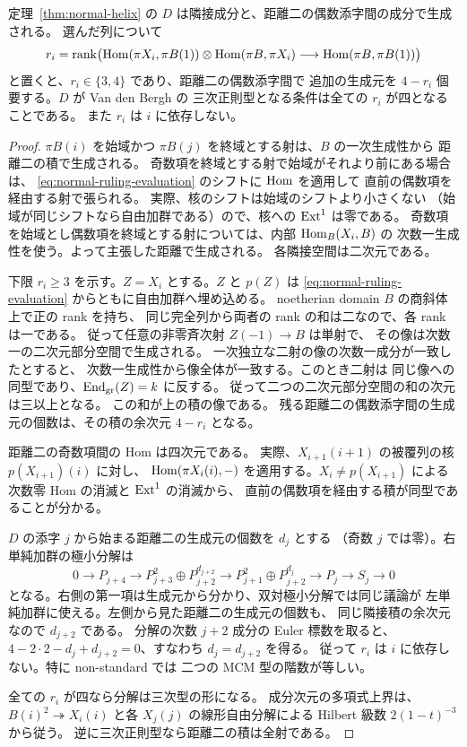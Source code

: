 \begin{corollary}[三次正則型からのずれ]
\label{cor:normal-cubic-defect}
定理~\ref{thm:normal-helix} の $D$ は隣接成分と、距離二の偶数添字間の成分で生成される。
選んだ列について
\[
 r_i=\operatorname{rank}\bigl(
 \operatorname{Hom}(\pi X_i,\pi B(1))\otimes\operatorname{Hom}(\pi B,\pi X_i)
 \longrightarrow\operatorname{Hom}(\pi B,\pi B(1))
 \bigr)
\]
と置くと、$r_i\in\{3,4\}$ であり、距離二の偶数添字間で
追加の生成元を $4-r_i$ 個要する。$D$ が Van den Bergh の
三次正則型となる条件は全ての $r_i$ が四となることである。
また $r_i$ は $i$ に依存しない。
\end{corollary}
\begin{proof}
$\pi B(i)$ を始域かつ $\pi B(j)$ を終域とする射は、$B$ の一次生成性から
距離二の積で生成される。
奇数項を終域とする射で始域がそれより前にある場合は、
\eqref{eq:normal-ruling-evaluation} のシフトに $\operatorname{Hom}$ を適用して
直前の偶数項を経由する射で張られる。
実際、核のシフトは始域のシフトより小さくない
（始域が同じシフトなら自由加群である）ので、核への $\operatorname{Ext}^1$ は零である。
奇数項を始域とし偶数項を終域とする射については、内部 $\operatorname{Hom}_B(X_i,B)$ の
次数一生成性を使う。よって主張した距離で生成される。
各隣接空間は二次元である。

下限 $r_i\ge3$ を示す。$Z=X_i$ とする。$Z$ と $p(Z)$ は
\eqref{eq:normal-ruling-evaluation} からともに自由加群へ埋め込める。
noetherian domain $B$ の商斜体上で正の rank を持ち、
同じ完全列から両者の rank の和は二なので、各 rank は一である。
従って任意の非零斉次射 $Z(-1)\to B$ は単射で、
その像は次数一の二次元部分空間で生成される。
一次独立な二射の像の次数一成分が一致したとすると、
次数一生成性から像全体が一致する。このとき二射は
同じ像への同型であり、$\operatorname{End}_{\mathrm{gr}}(Z)=k$ に反する。
従って二つの二次元部分空間の和の次元は三以上となる。
この和が上の積の像である。
残る距離二の偶数添字間の生成元の個数は、その積の余次元 $4-r_i$ となる。

距離二の奇数項間の Hom は四次元である。
実際、$X_{i+1}(i+1)$ の被覆列の核 $p(X_{i+1})(i)$ に対し、
$\operatorname{Hom}(\pi X_i(i),-)$ を適用する。$X_i\ne p(X_{i+1})$ による
次数零 Hom の消滅と $\operatorname{Ext}^1$ の消滅から、
直前の偶数項を経由する積が同型であることが分かる。

$D$ の添字 $j$ から始まる距離二の生成元の個数を $d_j$ とする
（奇数 $j$ では零）。右単純加群の極小分解は
\[
 0\longrightarrow P_{j+4}\longrightarrow
 P_{j+3}^{2}\oplus P_{j+2}^{d_{j+2}}\longrightarrow
 P_{j+1}^{2}\oplus P_{j+2}^{d_j}\longrightarrow P_j\longrightarrow S_j
 \longrightarrow0
\]
となる。右側の第一項は生成元から分かり、双対極小分解では同じ議論が
左単純加群に使える。左側から見た距離二の生成元の個数も、
同じ隣接積の余次元なので $d_{j+2}$ である。
分解の次数 $j+2$ 成分の Euler 標数を取ると、
$4-2\cdot2-d_j+d_{j+2}=0$、すなわち $d_j=d_{j+2}$ を得る。
従って $r_i$ は $i$ に依存しない。特に non-standard では
二つの MCM 型の階数が等しい。

全ての $r_i$ が四なら分解は三次型の形になる。
成分次元の多項式上界は、
$B(i)^2\twoheadrightarrow X_i(i)$ と各 $X_j(j)$ の線形自由分解による
Hilbert 級数 $2(1-t)^{-3}$ から従う。
逆に三次正則型なら距離二の積は全射である。
\end{proof}

